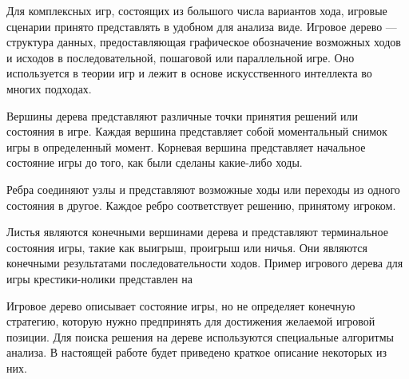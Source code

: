 Для комплексных игр, состоящих из большого числа вариантов хода, игровые сценарии принято представлять в удобном для анализа виде. Игровое дерево --- структура данных, предоставляющая графическое обозначение возможных ходов и исходов в последовательной, пошаговой или параллельной игре. Оно используется в теории игр и лежит в основе искусственного интеллекта во многих подходах.

Вершины дерева представляют различные точки принятия решений или состояния в игре. Каждая вершина представляет собой моментальный снимок игры в определенный момент. Корневая вершина представляет начальное состояние игры до того, как были сделаны какие-либо ходы.

Ребра соединяют узлы и представляют возможные ходы или переходы из одного состояния в другое. Каждое ребро соответствует решению, принятому игроком.

Листья являются конечными вершинами дерева и представляют терминальное состояния игры, такие как выигрыш, проигрыш или ничья. Они являются конечными результатами последовательности ходов. Пример игрового дерева для игры крестики-нолики представлен на 


Игровое дерево описывает состояние игры, но не определяет конечную стратегию, которую нужно предпринять для достижения желаемой игровой позиции. Для поиска решения на дереве используются специальные алгоритмы анализа. В настоящей работе будет приведено краткое описание некоторых из них.
